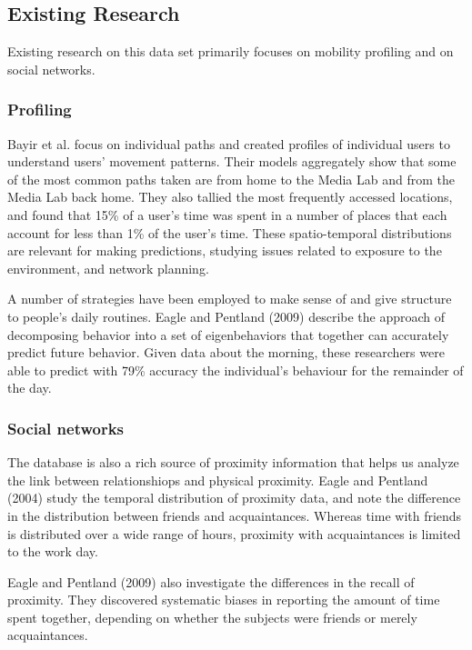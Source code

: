 \documentclass[pageno]{jpaper}
\begin{document}
\subsection{Existing Research}

Existing research on this data set primarily focuses on mobility profiling and on social networks. 

\subsubsection{Profiling}

Bayir et al. focus on individual paths and created profiles of individual users to understand users' movement patterns. Their models aggregately show that some of the most common paths taken are from home to the Media Lab and from the Media Lab back home. They also tallied the most frequently accessed locations, and found that 15\% of a user's time was spent in a number of places that each account for less than 1\% of the user's time. These spatio-temporal distributions are relevant for making predictions, studying issues related to exposure to the environment, and network planning. 

A number of strategies have been employed to make sense of and give structure to people's daily routines. Eagle and Pentland (2009) describe the approach of decomposing behavior into a set of eigenbehaviors that together can accurately predict future behavior. Given data about the morning, these researchers were able to predict with 79\% accuracy the individual's behaviour for the remainder of the day.

\subsubsection{Social networks}

The database is also a rich source of proximity information that helps us analyze the link between relationshiops and physical proximity. Eagle and Pentland (2004) study the temporal distribution of proximity data, and note the difference in the distribution between friends and acquaintances. Whereas time with friends is distributed over a wide range of hours, proximity with acquaintances is limited to the work day. 

Eagle and Pentland (2009) also investigate the differences in the recall of proximity. They discovered systematic biases in reporting the amount of time spent together, depending on whether the subjects were friends or merely acquaintances. 
\end{document}
